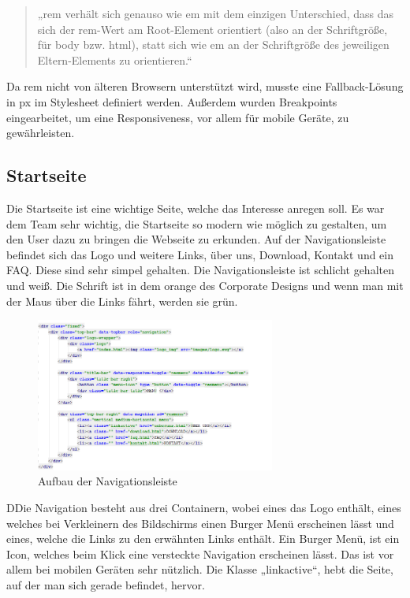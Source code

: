 \begin{quote}
„rem verhält sich genauso wie em mit dem einzigen Unterschied, dass das sich der rem-Wert am Root-Element orientiert (also an der Schriftgröße, für body bzw. html), statt sich wie em an der Schriftgröße des jeweiligen Eltern-Elements zu orientieren.“
\end{quote}

Da rem nicht von älteren Browsern unterstützt wird, musste eine Fallback-Lösung in px im Stylesheet definiert werden.   Außerdem wurden Breakpoints eingearbeitet, um eine Responsiveness, vor allem für mobile Geräte, zu gewährleisten. 

\subsection{Startseite}
Die Startseite ist eine wichtige Seite, welche das Interesse anregen soll. Es war dem Team sehr wichtig, die Startseite so modern wie möglich zu gestalten, um den User dazu zu bringen die Webseite zu erkunden. Auf der Navigationsleiste befindet sich das Logo und weitere Links, über uns, Download, Kontakt und ein FAQ. Diese sind sehr simpel gehalten. Die Navigationsleiste ist schlicht gehalten und weiß. Die Schrift ist in dem orange des Corporate Designs und wenn man mit der Maus über die Links fährt, werden sie grün. 

\begin{figure}[H] 
  \centering
     \includegraphics[width=0.7\textwidth]{webseite_abb3.png}
  \caption{Aufbau der Navigationsleiste}

\end{figure}

DDie Navigation besteht aus drei Containern, wobei eines das Logo enthält, eines welches bei Verkleinern des Bildschirms einen Burger Menü erscheinen lässt und eines, welche die Links zu den erwähnten Links enthält. Ein Burger Menü, ist ein Icon, welches beim Klick eine versteckte Navigation erscheinen lässt. Das ist vor allem bei mobilen Geräten sehr nützlich.  Die Klasse „linkactive“, hebt die Seite, auf der man sich gerade befindet, hervor. \\

